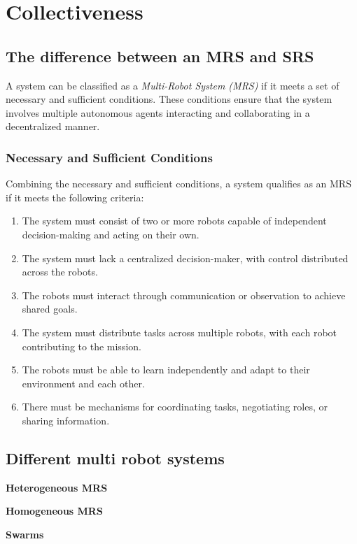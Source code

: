 \chapter{Collectiveness}


\section{The difference between an MRS and SRS}
A system can be classified as a \textit{Multi-Robot System (MRS)} if it meets a set of necessary and sufficient conditions. These conditions ensure that the system involves multiple autonomous agents interacting and collaborating in a decentralized manner.

\subsection{Necessary and Sufficient Conditions}
Combining the necessary and sufficient conditions, a system qualifies as an MRS if it meets the following criteria:

\begin{enumerate}
    \item The system must consist of two or more robots capable of independent decision-making and acting on their own. 
    \item The system must lack a centralized decision-maker, with control distributed across the robots. 
    \item The robots must interact through communication or observation to achieve shared goals. 
    \item The system must distribute tasks across multiple robots, with each robot contributing to the mission. 
    \item The robots must be able to learn independently and adapt to their environment and each other. 
    \item There must be mechanisms for coordinating tasks, negotiating roles, or sharing information. 
\end{enumerate}


\section{Different multi robot systems}

\textbf{Heterogeneous MRS}

\textbf{Homogeneous MRS}

\textbf{Swarms} 

